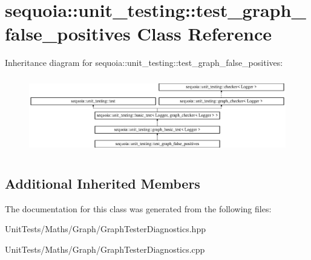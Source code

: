 \hypertarget{classsequoia_1_1unit__testing_1_1test__graph__false__positives}{}\section{sequoia\+::unit\+\_\+testing\+::test\+\_\+graph\+\_\+false\+\_\+positives Class Reference}
\label{classsequoia_1_1unit__testing_1_1test__graph__false__positives}
Inheritance diagram for sequoia\+::unit\+\_\+testing\+::test\+\_\+graph\+\_\+false\+\_\+positives\+:\begin{figure}[H]
\begin{center}
\leavevmode
\includegraphics[height=3.357314cm]{classsequoia_1_1unit__testing_1_1test__graph__false__positives}
\end{center}
\end{figure}
\subsection*{Additional Inherited Members}


The documentation for this class was generated from the following files\+:\begin{DoxyCompactItemize}
\item 
Unit\+Tests/\+Maths/\+Graph/Graph\+Tester\+Diagnostics.\+hpp\item 
Unit\+Tests/\+Maths/\+Graph/Graph\+Tester\+Diagnostics.\+cpp\end{DoxyCompactItemize}
